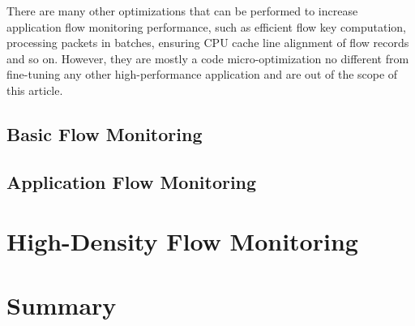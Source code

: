There are many other optimizations that can be performed to increase application flow monitoring performance, such as efficient flow key computation, processing packets in batches, ensuring CPU cache line alignment of flow records and so on. However, they are mostly a code micro-optimization no different from fine-tuning any other high-performance application and are out of the scope of this article.

\subsection{Basic Flow Monitoring}

\subsection{Application Flow Monitoring}




\section{High-Density Flow Monitoring}\label{sec:performance-high-density}

\section{Summary}\label{sec:performance-summary}